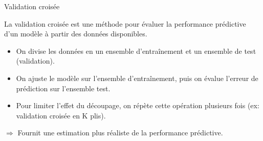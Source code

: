 \documentclass{BeamerTemplate}
\begin{document}
\begin{frame}[t]{Validation croisée}

{\small
\alert{La validation croisée} est une méthode pour évaluer la performance prédictive d’un modèle à partir des données disponibles.

\bigskip

\begin{itemize}\itemsep5mm
\item On \alert{divise les données} en un ensemble d’entraînement et un ensemble de test (validation).
\item On \alert{ajuste le modèle sur l’ensemble d’entraînement}, puis on \alert{évalue l’erreur de prédiction} sur l’ensemble test.
\item Pour limiter l’effet du découpage, on répète cette opération plusieurs fois (ex: \alert{validation croisée en K plis}).
\end{itemize}

\bigskip
$\Rightarrow$ Fournit une estimation plus réaliste de la performance prédictive.
}
\end{frame}
\end{document}
